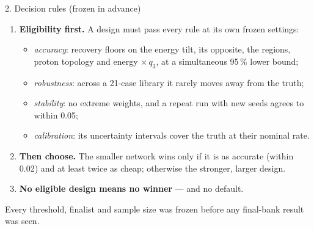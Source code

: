 \documentclass[aspectratio=169,10pt]{beamer}
\def\evidencetext{}
\begin{document}
\gdef\evidencetext{\texttt{PROTOCOL-20260925.md (6, 10)}}
\begin{frame}{2. Decision rules (frozen in advance)}
\small\begin{enumerate}
\item \textbf{Eligibility first.} A design must pass every rule at its own frozen settings:
  \begin{itemize}\item[--] \emph{accuracy}: recovery floors on the energy tilt, its opposite, the regions, proton
  topology and energy $\times\,q_3$, at a simultaneous 95\,\% lower bound;
  \item[--] \emph{robustness}: across a 21-case library it rarely moves away from the truth;
  \item[--] \emph{stability}: no extreme weights, and a repeat run with new seeds agrees to within 0.05;
  \item[--] \emph{calibration}: its uncertainty intervals cover the truth at their nominal rate.\end{itemize}
\item \textbf{Then choose.} The smaller network wins only if it is as accurate (within 0.02) and at least twice
  as cheap; otherwise the stronger, larger design.
\item \textbf{No eligible design means no winner} --- and no default.
\end{enumerate}
\vspace{0.1cm}\footnotesize Every threshold, finalist and sample size was frozen before any final-bank result
was seen.
\end{frame}
\end{document}
